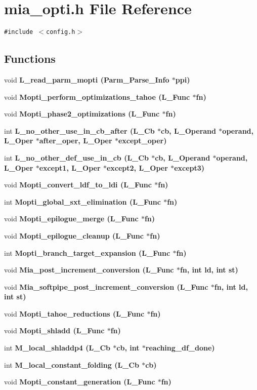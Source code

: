 \section{mia\_\-opti.h File Reference}
\label{mia__opti_8h}
{\tt \#include $<$config.h$>$}\par
\subsection*{Functions}
\begin{CompactItemize}
\item 
void \bf{L\_\-read\_\-parm\_\-mopti} (Parm\_\-Parse\_\-Info $\ast$ppi)
\item 
void \bf{Mopti\_\-perform\_\-optimizations\_\-tahoe} (L\_\-Func $\ast$fn)
\item 
void \bf{Mopti\_\-phase2\_\-optimizations} (L\_\-Func $\ast$fn)
\item 
int \bf{L\_\-no\_\-other\_\-use\_\-in\_\-cb\_\-after} (L\_\-Cb $\ast$cb, L\_\-Operand $\ast$operand, L\_\-Oper $\ast$after\_\-oper, L\_\-Oper $\ast$except\_\-oper)
\item 
int \bf{L\_\-no\_\-other\_\-def\_\-use\_\-in\_\-cb} (L\_\-Cb $\ast$cb, L\_\-Operand $\ast$operand, L\_\-Oper $\ast$except1, L\_\-Oper $\ast$except2, L\_\-Oper $\ast$except3)
\item 
void \bf{Mopti\_\-convert\_\-ldf\_\-to\_\-ldi} (L\_\-Func $\ast$fn)
\item 
int \bf{Mopti\_\-global\_\-sxt\_\-elimination} (L\_\-Func $\ast$fn)
\item 
void \bf{Mopti\_\-epilogue\_\-merge} (L\_\-Func $\ast$fn)
\item 
void \bf{Mopti\_\-epilogue\_\-cleanup} (L\_\-Func $\ast$fn)
\item 
int \bf{Mopti\_\-branch\_\-target\_\-expansion} (L\_\-Func $\ast$fn)
\item 
void \bf{Mia\_\-post\_\-increment\_\-conversion} (L\_\-Func $\ast$fn, int ld, int st)
\item 
void \bf{Mia\_\-softpipe\_\-post\_\-increment\_\-conversion} (L\_\-Func $\ast$fn, int ld, int st)
\item 
void \bf{Mopti\_\-tahoe\_\-reductions} (L\_\-Func $\ast$fn)
\item 
void \bf{Mopti\_\-shladd} (L\_\-Func $\ast$fn)
\item 
int \bf{M\_\-local\_\-shladdp4} (L\_\-Cb $\ast$cb, int $\ast$reaching\_\-df\_\-done)
\item 
int \bf{M\_\-local\_\-constant\_\-folding} (L\_\-Cb $\ast$cb)
\item 
void \bf{Mopti\_\-constant\_\-generation} (L\_\-Func $\ast$fn)
\end{CompactItemize}
